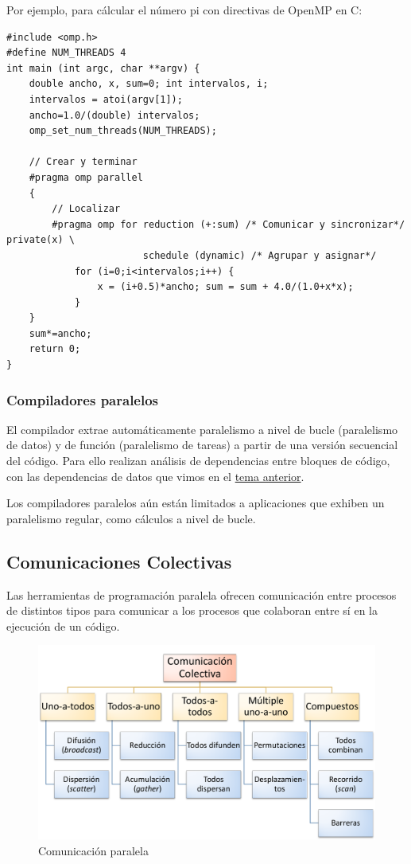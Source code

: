 \documentclass[10pt,a4paper,spanish]{report}
\begin{document}
Por ejemplo, para cálcular el número pi con directivas de OpenMP en C:
\begin{verbatim}
#include <omp.h>
#define NUM_THREADS 4
int main (int argc, char **argv) {
    double ancho, x, sum=0; int intervalos, i;
    intervalos = atoi(argv[1]);
    ancho=1.0/(double) intervalos;
    omp_set_num_threads(NUM_THREADS);

    // Crear y terminar
    #pragma omp parallel
    {
        // Localizar 
        #pragma omp for reduction (+:sum) /* Comunicar y sincronizar*/ private(x) \
                        schedule (dynamic) /* Agrupar y asignar*/
            for (i=0;i<intervalos;i++) {
                x = (i+0.5)*ancho; sum = sum + 4.0/(1.0+x*x);
            }
    }
    sum*=ancho;
    return 0;
}
\end{verbatim}

\textcolor[rgb]{0.2,0.4,0.8}{\subsubsection{Compiladores paralelos}}
El compilador extrae automáticamente paralelismo a nivel de bucle (paralelismo de datos) y de función (paralelismo de tareas) a partir de una versión secuencial del código. Para ello realizan análisis de dependencias entre bloques de código, con las dependencias de datos que vimos en el \hyperref[dependencias_datos]{tema anterior}.

Los compiladores paralelos aún están limitados a aplicaciones que exhiben un paralelismo regular, como cálculos a nivel de bucle. 

\textcolor[rgb]{0.2,0.4,0.8}{\subsection{Comunicaciones Colectivas}}
Las herramientas de programación paralela ofrecen comunicación entre procesos de distintos tipos para comunicar a los procesos que colaboran entre sí en la ejecución de un código.

\begin{figure}[!h]
\centering
\includegraphics[width=1\textwidth]{27}
\caption{Comunicación paralela}
\label{comunicacion_paralela_esquema}
\end{figure}
\end{document}
